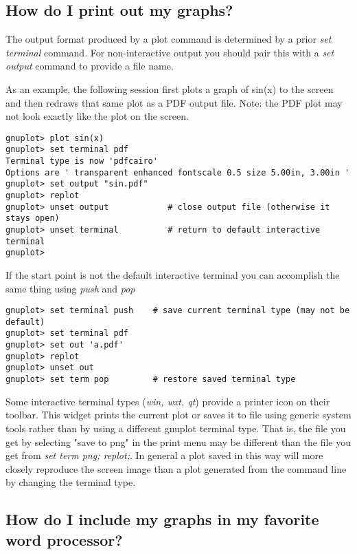 \documentclass[a4paper,11pt]{article}
\begin{document}
\subsection{How do I print out my graphs?}

The output format produced by a plot command is determined by a
prior {\em set terminal} command.  For non-interactive output
you should pair this with a {\em set output} command to provide
a file name.

As an example, the following session first plots a graph of sin(x) to the
screen and then redraws that same plot as a PDF output file.
Note: the PDF plot may not look exactly like the plot on the screen.

\small
\begin{verbatim}
gnuplot> plot sin(x)
gnuplot> set terminal pdf
Terminal type is now 'pdfcairo'
Options are ' transparent enhanced fontscale 0.5 size 5.00in, 3.00in '
gnuplot> set output "sin.pdf"
gnuplot> replot
gnuplot> unset output            # close output file (otherwise it stays open)
gnuplot> unset terminal          # return to default interactive terminal
gnuplot>
\end{verbatim}
\normalsize

If the start point is not the default interactive terminal you
can accomplish the same thing using {\em push} and {\em pop}
\small
\begin{verbatim}
gnuplot> set terminal push    # save current terminal type (may not be default)
gnuplot> set terminal pdf
gnuplot> set out 'a.pdf'
gnuplot> replot
gnuplot> unset out
gnuplot> set term pop         # restore saved terminal type
\end{verbatim}
\normalsize

Some interactive terminal types ({\em win, wxt, qt}) provide a printer icon
on their toolbar. This widget prints the current plot or saves it to file
using generic system tools rather than by using a different gnuplot terminal type.
That is, the file you get by selecting "save to png" in the print menu may be
different than the file you get from {\em set term png; replot;}.
In general a plot saved in this way will more closely reproduce the screen image than
a plot generated from the command line by changing the terminal type.


\subsection{How do I include my graphs in my favorite word processor?}
\end{document}
